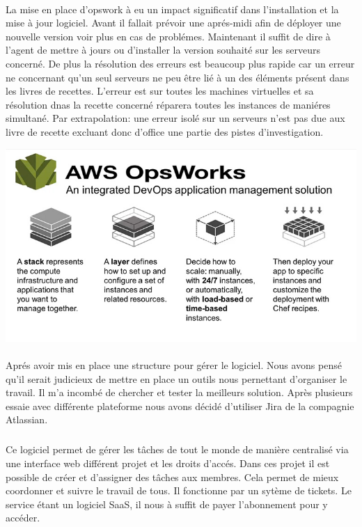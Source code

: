 \documentclass[11pt, a4paper ]{article}
\begin{document}
\begin{spacing}{1.5}
\paragraph{}
La mise en place d'opswork à eu un impact significatif dans l'installation et la mise à jour logiciel. Avant il fallait prévoir une aprés-midi afin de déployer une nouvelle version voir plus en cas de problémes. Maintenant il suffit de dire à l'agent de mettre à jours ou d'installer la version souhaité sur les serveurs concerné. De plus la résolution des erreurs est beaucoup plus rapide car un erreur ne concernant qu'un seul serveurs ne peu être lié à un des éléments présent dans les livres de recettes. L'erreur est sur toutes les machines virtuelles et sa résolution dnas la recette concerné réparera toutes les instances de maniéres simultané. Par extrapolation: une erreur isolé sur un serveurs n'est pas due aux livre de recette excluant donc d'office une partie des pistes d'investigation.
\begin{center}
	\includegraphics[width=\textwidth]{images/opswork.png}
\end{center}

\paragraph{}
Aprés avoir mis en place une structure pour gérer le logiciel. Nous avons pensé qu'il serait judicieux de mettre en place un outils nous pernettant d'organiser le travail. Il m'a incombé de chercher et tester la meilleurs solution. Après plusieurs essaie avec différente plateforme nous avons décidé d'utiliser Jira de la compagnie Atlassian. 
\subparagraph{}
Ce logiciel permet de gérer les tâches de tout le monde de manière centralisé via une interface web différent projet et les droits d'accés. Dans ces projet il est possible de créer et d'assigner des tâches aux membres. Cela permet de mieux coordonner et suivre le travail de tous. Il fonctionne par un sytème de tickets. Le service étant un logiciel SaaS, il nous à suffit de payer l'abonnement pour y accéder.



\end{spacing}
\end{document}
